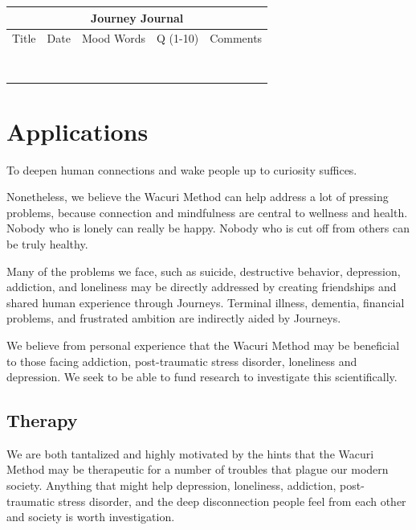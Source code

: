 \documentclass[12pt]{book}
\begin{document}
\begin{tabular}{ |p{2cm}||p{2cm}|p{3cm}|p{1cm}|p{5cm}|  }
 \hline
 \multicolumn{5}{|c|}{Journey Journal} \\
 \hline
 Title& Date & Mood Words & Q (1-10) & Comments\\
  \hline
 \hline
 & & & & \\
 \hline 
 & & & & \\
 \hline 
 & & & & \\
 \hline 
 & & & & \\
 \hline 
 & & & & \\
 \hline 
 & & & & \\
 \hline 
 & & & & \\
 \hline 
  & & & & \\
 \hline
  \hline
\end{tabular}

\chapter{Applications}

To deepen human connections and wake people up
to curiosity suffices.

Nonetheless, we believe the Wacuri Method can help address a lot of
pressing problems, because connection and mindfulness are central to
wellness and health. Nobody who is lonely can really be happy. Nobody
who is cut off from others can be truly healthy.

Many of the problems we face, such as suicide, destructive behavior,
depression, addiction, and loneliness may be directly addressed by
creating friendships and shared human experience through
Journeys. Terminal illness, dementia, financial problems, and
frustrated ambition are indirectly aided by Journeys.

We believe from personal experience that the Wacuri Method may be
beneficial to those facing addiction, post-traumatic stress disorder,
loneliness and depression.  We seek to be able to fund research to
investigate this scientifically.

\section{Therapy}

We are both tantalized and highly motivated by the hints that the
Wacuri Method may be therapeutic for a number of troubles that plague
our modern society. Anything that might help depression, loneliness,
addiction, post-traumatic stress disorder, and the deep disconnection
people feel from each other and society is worth investigation.
\end{document}
